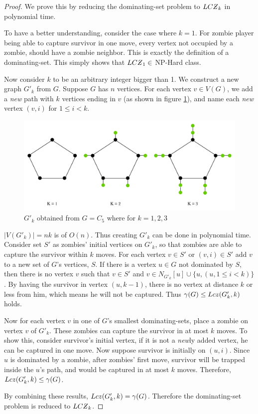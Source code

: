 \documentclass[1p]{elsarticle}
\newcommand{\NPZ}{\ooalign{$Z$\cr\hfil\rule[.8ex]{.3em}{.09ex}\hfil\cr}}
\newcommand{\zn}{\ooalign{$z$\cr\hfil\rule[.5ex]{.2em}{.08ex}\hfil\cr}}
\begin{document}
	\begin{proof}
		We prove this by reducing the dominating-set problem to $LC\NPZ_k$ in polynomial time.

		To have a better understanding, consider the case where $k=1$. For zombie player being able to capture survivor in
		one move, every vertex not occupied by a zombie, should have a zombie neighbor. This is exactly the definition
		of a dominating-set. This simply shows that $LC\NPZ_1 \in$ NP-Hard class.

		Now consider $k$ to be an arbitrary integer bigger than 1. We construct a new graph $G'_k$ from $G$. Suppose $G$
		has $n$ vertices. For each vertex $v \in V(G)$, we add a {\it new} path with $k$ vertices ending in $v$ (as
		shown in figure \ref{fig:p7}), and name each {\it new} vertex $(v,i)$ for $1 \leq i < k$. 

		\begin{figure}[h!]
			\centering
			\includegraphics[width=0.9\linewidth]{fig/LCZ.png}
			\caption{$G'_k$ obtained from $G = C_5$ where for $k = 1,2,3$}
			\label{fig:p7}
		\end{figure}		


		$|V(G'_k)| = nk$ is of $O(n)$. Thus creating $G'_k$ can be done in polynomial time. Consider set $S'$ as zombies'
		initial vertices on $G'_k$, so that zombies are able to capture the survivor within $k$ moves. For each vertex $v \in
		S'$ or $(v,i) \in S'$ add $v$ to a new set of $G$'s vertices, $S$. If there is a vertex $u \in G$ not dominated by
		$S$, then there is no vertex $v$ such that $v \in S'$ and $v \in N_{G'_k}[u] \cup \{u, (u,1 \leq i < k)\}$. By having
		the survivor in vertex $(u, k-1)$, there is no vertex at distance $k$ or less from him, which means he will not
		be captured. Thus $\gamma(G) \leq Lc\zn(G'_k,k)$ holds.
		
		Now for each vertex $v$ in one of $G$'s smallest dominating-sets, place a zombie on vertex $v$ of $G'_k$. These
		zombies can capture the survivor in at most $k$ moves. To show this, consider survivor's initial vertex, if it
		is not a {\it new}ly added vertex, he can be captured in one move. Now suppose survivor is initially on $(u,i)$. Since
		$u$ is dominated by a zombie, after zombies' first move, survivor will be trapped inside the $u$'s path, and would
		be captured in at most $k$ moves. Therefore, $Lc\zn(G'_k,k) \leq \gamma(G)$.

		By combining these results, $Lc\zn(G'_k,k) = \gamma(G)$. Therefore the dominating-set problem is reduced to
		$LC\NPZ_k$.

	\end{proof}
\end{document}
